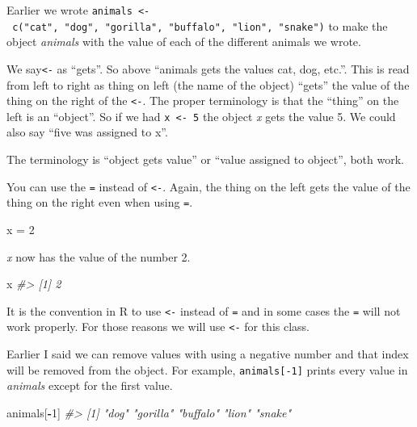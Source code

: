 \documentclass[
  12pt,
]{book}
\newenvironment{Shaded}{\begin{snugshade}}{\end{snugshade}}
\newcommand{\CommentTok}[1]{\textcolor[rgb]{0.37,0.37,0.37}{\textit{#1}}}
\newcommand{\DecValTok}[1]{\textcolor[rgb]{0.06,0.06,0.06}{#1}}
\newcommand{\NormalTok}[1]{#1}
\newcommand{\OperatorTok}[1]{\textcolor[rgb]{0.43,0.43,0.43}{\textbf{#1}}}
\newcommand{\StringTok}[1]{\textcolor[rgb]{0.5,0.5,0.5}{#1}}
\begin{document}
Earlier we wrote \texttt{animals\ \textless{}-\ c("cat",\ "dog",\ "gorilla",\ "buffalo",\ "lion",\ "snake")} to make the object \emph{animals} with the value of each of the different animals we wrote.

We say\texttt{\textless{}-} as ``gets''. So above ``animals gets the values cat, dog, etc.''. This is read from left to right as thing on left (the name of the object) ``gets'' the value of the thing on the right of the \texttt{\textless{}-}. The proper terminology is that the ``thing'' on the left is an ``object''. So if we had \texttt{x\ \textless{}-\ 5} the object \emph{x} gets the value 5. We could also say ``five was assigned to x''.

The terminology is ``object gets value'' or ``value assigned to object'', both work.

You can use the \texttt{=} instead of \texttt{\textless{}-}. Again, the thing on the left gets the value of the thing on the right even when using \texttt{=}.

\begin{Shaded}
\begin{Highlighting}[]
\NormalTok{x =}\StringTok{ }\DecValTok{2}
\end{Highlighting}
\end{Shaded}

\emph{x} now has the value of the number 2.

\begin{Shaded}
\begin{Highlighting}[]
\NormalTok{x}
\CommentTok{\#> [1] 2}
\end{Highlighting}
\end{Shaded}

It is the convention in R to use \texttt{\textless{}-} instead of \texttt{=} and in some cases the \texttt{=} will not work properly. For those reasons we will use \texttt{\textless{}-} for this class.

Earlier I said we can remove values with using a negative number and that index will be removed from the object. For example, \texttt{animals{[}-1{]}} prints every value in \emph{animals} except for the first value.

\begin{Shaded}
\begin{Highlighting}[]
\NormalTok{animals[}\OperatorTok{{-}}\DecValTok{1}\NormalTok{]}
\CommentTok{\#> [1] "dog"     "gorilla" "buffalo" "lion"    "snake"}
\end{Highlighting}
\end{Shaded}
\end{document}
